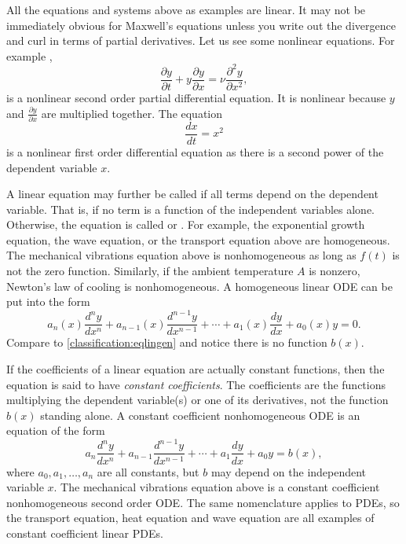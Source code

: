 All the equations and systems above as examples are linear.  
It may not be immediately obvious for Maxwell's equations unless you write out
the divergence and curl in terms of partial derivatives.  Let us see some
nonlinear equations.  For example ,
\begin{equation*}
\frac{\partial y}{\partial t} + 
y \frac{\partial y}{\partial x} =
\nu \frac{\partial^2 y}{\partial x^2} ,
\end{equation*}
is a nonlinear second order partial differential equation.  It is nonlinear
because $y$ and $\frac{\partial y}{\partial x}$ are multiplied together.
The equation
\begin{equation} \label{classification:eqnonlinode}
\frac{dx}{dt} = x^2
\end{equation}
is a nonlinear first order differential equation as there is a second power of
the dependent variable $x$.

\medskip

A linear equation may further be called \emph{} if
all terms depend on the dependent variable.  That is, if no
term is a function of the independent variables alone.  Otherwise, the
equation is called \emph{} or
\emph{}.  For example,
the exponential growth equation, the wave equation, or the transport equation above
are homogeneous. The mechanical vibrations equation above is nonhomogeneous
as long as $f(t)$ is not the zero function.  Similarly, if the ambient temperature $A$ is nonzero,
Newton's law of cooling is nonhomogeneous.
A homogeneous linear ODE can be put into the form
\begin{equation*}
a_n(x) \frac{d^n y}{dx^n} + 
a_{n-1}(x) \frac{d^{n-1} y}{dx^{n-1}} + 
\cdots
+
a_{1}(x) \frac{dy}{dx}
+
a_{0}(x) y = 0 .
\end{equation*}
Compare to \eqref{classification:eqlingen} and notice there is no
function $b(x)$.

\medskip

If the coefficients of a linear equation are actually constant functions,
then the equation is said to have
\emph{constant coefficients}.
The coefficients are the functions multiplying the dependent
variable(s) or one of its derivatives, not the function $b(x)$ standing alone.
A constant coefficient nonhomogeneous ODE is an equation of the form
\begin{equation*}
a_n \frac{d^n y}{dx^n} + 
a_{n-1} \frac{d^{n-1} y}{dx^{n-1}} + 
\cdots
+
a_{1} \frac{dy}{dx}
+
a_{0} y = b(x) ,
\end{equation*}
where $a_0, a_1, \ldots, a_n$ are all constants,
but $b$ may depend on 
the independent variable $x$.
The mechanical vibrations equation
above is a constant coefficient nonhomogeneous second order ODE\@.
The same nomenclature applies to PDEs, so the transport equation,
heat equation and wave equation are all examples of constant coefficient
linear PDEs.

